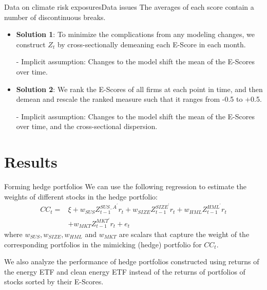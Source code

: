 \begin{frame}{Data on climate risk exposures}{Data issues}
	The averages of each score contain a number of discontinuous breaks.
	\begin{itemize}
		\item \textbf{Solution 1}: To minimize the complications from any modeling changes, we construct
		$Z_t$ by cross-sectionally demeaning each E-Score in each month.
		\item [-] Implicit assumption: Changes to the model shift the mean of the E-Scores over time. 
		\item \textbf{Solution 2}: We rank the E-Scores of all firms at each point in time, and then demean and rescale the ranked measure such that it ranges from -0.5 to +0.5.
		\item [-] Implicit assumption: Changes to the model shift the mean of the E-Scores over time, and the cross-sectional dispersion.
	\end{itemize} 
\end{frame}

\section{Results}
\begin{frame}{Forming hedge portfolios}
	We can use the following regression to estimate the weights of different stocks in the hedge portfolio:
	$$
	\begin{aligned}
	C C_{t}=& \xi+w_{S U S} Z_{t-1}^{S U S_{-} A^{\prime}} r_{t}+w_{S I Z E} Z_{t-1}^{S I Z E^{\prime}} r_{t}+w_{H M L} Z_{t-1}^{H M L^{\prime}} r_{t} \\
	&+w_{M K T} Z_{t-1}^{M K T^{\prime}} r_{t}+e_{t}
	\end{aligned}
	$$
	where $w_{S U S}, w_{S I Z E}, w_{H M L}$ and $w_{M K T}$ are scalars that capture the weight of the corresponding portfolios in the mimicking (hedge) portfolio for $C C_{t}.$
	\medskip
	 
	We also analyze the performance of hedge portfolios constructed using returns of the energy ETF and clean energy ETF instead of the returns of portfolios of stocks sorted by their E-Scores. 
\end{frame}

